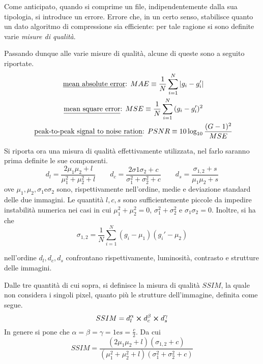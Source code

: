 \documentclass{subfiles}
\begin{document}
Come anticipato, quando si comprime un file, indipendentemente dalla sua tipologia, si introduce un errore.
Errore che, in un certo senso, stabilisce quanto un dato algoritmo di compressione sia efficiente: per tale ragione si sono definite varie \emph{misure di qualità}.

Passando dunque alle varie misure di qualità, alcune di queste sono a seguito riportate.
\[\begin{gathered}
        \text{\underline{mean absolute error}:} MAE \equiv \frac{1}{N} \sum\limits_{i = 1}^{N}{\abs{g_{i} - g_{i}'}} \\
        \text{\underline{mean square error}:} MSE \equiv \frac{1}{N} \sum\limits_{i = 1}^{N}{(g_{i} - g_{i}')^{2}} \\
        \text{\underline{peak-to-peak signal to noise ration}:} PSNR \equiv 10\log_{10}\frac{(G - 1)^{2}}{MSE}
    \end{gathered}\]


Si riporta ora una misura di qualità effettivamente utilizzata, nel farlo saranno prima definite le sue componenti.
\[
    d_{l} = \frac{2 \mu_{1}\mu_{2} + l}{\mu_{1}^{2} + \mu_{2}^{2} + l} \qquad
    d_{c} = \frac{2 \sigma{1}\sigma_{2} + c}{\sigma_{1}^{2} + \sigma_{2}^{2} + c} \qquad
    d_{s} = \frac{\sigma_{1,2} + s}{\mu_{1}\mu_{2} + s}
\]
ove \(\mu_{1}, \mu_{2}, \sigma_{1} \text{e} \sigma_{2}\) sono, rispettivamente nell'ordine, medie e deviazione standard delle due immagini.
Le quantità \(l, c, s\) sono sufficientemente piccole da impedire instabilità numerica nei casi in cui \(\mu_{1}^{2} + \mu_{2}^{2} = 0\),
\( \sigma_{1}^{2} + \sigma_{2}^{2}\) e \(\sigma_{1}\sigma_{2} = 0\). Inoltre, si ha che
\[
    \sigma_{1, 2} = \frac{1}{N} \sum\limits_{i = 1}^{N}{(g_{i} - \mu_{1})(g_{i}' - \mu_{2})}
\]

\begin{Note*}
    nell'ordine \(d_{l}, d_{c}, d_{s}\) confrontano rispettivamente, luminosità, contrasto e strutture delle immagini.
\end{Note*}

Dalle tre quantità di cui sopra, si definisce la misura di qualità \(SSIM\), la quale non considera i singoli pixel, quanto più le strutture dell'immagine,
definita come segue.
\[
    SSIM = d_{l}^{\alpha} \cp d_{c}^{\beta} \cp d_{s}^{\gamma}
\]
In genere si pone che \(\alpha = \beta = \gamma = 1 \text{e} s = \tfrac{c}{2}\). Da cui
\[
    SSIM = \frac{(2 \mu_{1}\mu_{2} + l)(\sigma_{1,2} + c)}{(\mu_{1}^{2} + \mu_{2}^{2} + l)(\sigma_{1}^{2} + \sigma_{2}^{2} + c)}
\]
\end{document}

